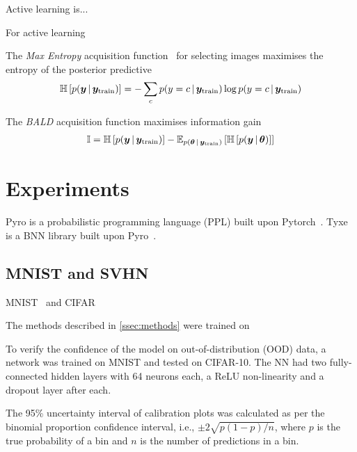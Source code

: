 \documentclass[10pt,a4paper,twocolumn]{article}
\begin{document}
Active learning is...

For active learning

The \emph{Max Entropy} acquisition function~\cite{gal2017deep,shannon1948mathematical} for selecting images maximises the entropy of the posterior predictive
\begin{align}
    \mathbb{H}\left[p(\bm y \, | \, \bm y_{\text{train}})\right] = -\sum_c p(y = c \, | \, \bm y_{\text{train}}) \log p(y = c \, | \, \bm y_{\text{train}})
\end{align}

The \emph{BALD} acquisition function maximises information gain
\begin{align}
    \mathbb{I} = \mathbb{H}\left[p(\bm y \, | \, \bm y_{\text{train}})\right] - \mathbb{E}_{p(\bm \theta \, | \, \bm y_{\text{train}})}\left[\mathbb{H}\left[p(\bm y \, | \, \bm \theta)\right]\right]
\end{align}

\section{Experiments}

\cite{paszke2019pytorch}
Pyro is a probabilistic programming language (PPL) built upon Pytorch~\cite{bingham2018pyro}.
Tyxe is a BNN library built upon Pyro~\cite{ritter2021tyxe}.

\subsection{MNIST and SVHN}\label{ssec:exp-mnist}

MNIST~\cite{lecun1998gradient} and CIFAR~\cite{krizhevsky2009learning}

The methods described in \cref{ssec:methods} were trained on

To verify the confidence of the model on out-of-distribution (OOD) data, a network was trained on MNIST and tested on CIFAR-10.
The NN had two fully-connected hidden layers with 64 neurons each, a ReLU non-linearity and a dropout layer after each.

The 95\% uncertainty interval of calibration plots was calculated as per the binomial proportion confidence interval, i.e., \(\pm 2 \sqrt{p (1-p) / n}\), where \(p\) is the true probability of a bin and \(n\) is the number of predictions in a bin.
\end{document}
